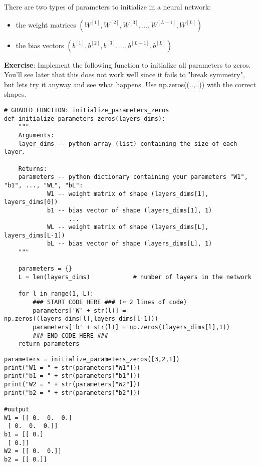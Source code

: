 
There are two types of parameters to initialize in a neural network:
\begin{itemize}
\item the weight matrices $(W^{[1]}, W^{[2]}, W^{[3]}, ..., W^{[L-1]}, W^{[L]})$
\item the bias vectors $(b^{[1]}, b^{[2]}, b^{[3]}, ..., b^{[L-1]}, b^{[L]})$
\end{itemize}

{\textbf {Exercise}}: Implement the following function to initialize all parameters to zeros. You'll see later that this does not work well since it fails to "break symmetry", but lets try it anyway and see what happens. Use np.zeros((..,..)) with the correct shapes.
\begin{verbatim}
# GRADED FUNCTION: initialize_parameters_zeros 
def initialize_parameters_zeros(layers_dims):
    """
    Arguments:
    layer_dims -- python array (list) containing the size of each layer.
    
    Returns:
    parameters -- python dictionary containing your parameters "W1", "b1", ..., "WL", "bL":
            W1 -- weight matrix of shape (layers_dims[1], layers_dims[0])
            b1 -- bias vector of shape (layers_dims[1], 1)
                  ...
            WL -- weight matrix of shape (layers_dims[L], layers_dims[L-1])
            bL -- bias vector of shape (layers_dims[L], 1)
    """
    
    parameters = {}
    L = len(layers_dims)            # number of layers in the network
    
    for l in range(1, L):
        ### START CODE HERE ### (≈ 2 lines of code)
        parameters['W' + str(l)] = np.zeros((layers_dims[l],layers_dims[l-1])) 
        parameters['b' + str(l)] = np.zeros((layers_dims[l],1)) 
        ### END CODE HERE ###
    return parameters
\end{verbatim}

\begin{verbatim}
parameters = initialize_parameters_zeros([3,2,1])
print("W1 = " + str(parameters["W1"]))
print("b1 = " + str(parameters["b1"]))
print("W2 = " + str(parameters["W2"]))
print("b2 = " + str(parameters["b2"]))

#output
W1 = [[ 0.  0.  0.]
 [ 0.  0.  0.]]
b1 = [[ 0.]
 [ 0.]]
W2 = [[ 0.  0.]]
b2 = [[ 0.]]

\end{verbatim}

